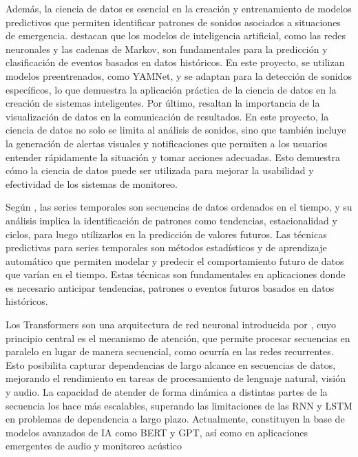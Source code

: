 Además, la ciencia de datos es esencial en la creación y entrenamiento de modelos predictivos que permiten identificar patrones de sonidos asociados a situaciones de emergencia. \citeauthor{russell_artificial_2022} \citeyear{russell_artificial_2022} destacan que los modelos de inteligencia artificial, como las redes neuronales y las cadenas de Markov, son fundamentales para la predicción y clasificación de eventos basados en datos históricos. En este proyecto, se utilizan modelos preentrenados, como YAMNet, y se adaptan para la detección de sonidos específicos, lo que demuestra la aplicación práctica de la ciencia de datos en la creación de sistemas inteligentes. Por último, \citeauthor{garcia_ciencia_2018} \citeyear{garcia_ciencia_2018} resaltan la importancia de la visualización de datos en la comunicación de resultados. En este proyecto, la ciencia de datos no solo se limita al análisis de sonidos, sino que también incluye la generación de alertas visuales y notificaciones que permiten a los usuarios entender rápidamente la situación y tomar acciones adecuadas. Esto demuestra cómo la ciencia de datos puede ser utilizada para mejorar la usabilidad y efectividad de los sistemas de monitoreo.


Según \citeauthor{hyndman_forecasting_2018} \citeyear{hyndman_forecasting_2018}, las series temporales son secuencias de datos ordenados en el tiempo, y su análisis implica la identificación de patrones como tendencias, estacionalidad y ciclos, para luego utilizarlos en la predicción de valores futuros. Las técnicas predictivas para series temporales son métodos estadísticos y de aprendizaje automático que permiten modelar y predecir el comportamiento futuro de datos que varían en el tiempo. Estas técnicas son fundamentales en aplicaciones donde es necesario anticipar tendencias, patrones o eventos futuros basados en datos históricos.


Los Transformers son una arquitectura de red neuronal introducida por \citeauthor{vaswani2017attention} \citeyear{vaswani2017attention}, cuyo principio central es el mecanismo de atención, que permite procesar secuencias en paralelo en lugar de manera secuencial, como ocurría en las redes recurrentes. Esto posibilita capturar dependencias de largo alcance en secuencias de datos, mejorando el rendimiento en tareas de procesamiento de lenguaje natural, visión y audio. La capacidad de atender de forma dinámica a distintas partes de la secuencia los hace más escalables, superando las limitaciones de las RNN y LSTM en problemas de dependencia a largo plazo. Actualmente, constituyen la base de modelos avanzados de IA como BERT y GPT, así como en aplicaciones emergentes de audio y monitoreo acústico

